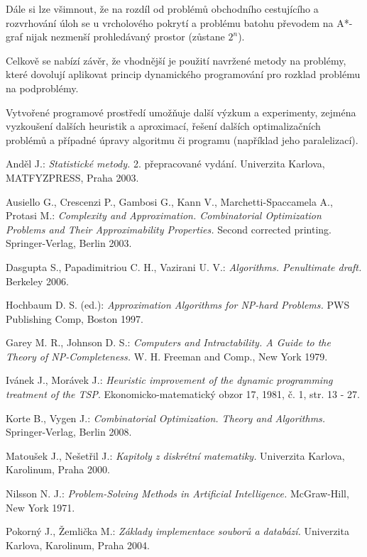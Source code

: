 \documentclass[12pt,notitlepage,fleqn]{report} %
\theoremstyle{definition}
\begin{document}
Dále si lze všimnout, že na rozdíl od problémů obchodního cestujícího a rozvrhování úloh se u vrcholového pokrytí a problému batohu převodem na A*-graf nijak nezmenší prohledávaný prostor (zůstane $2^n$).

Celkově se nabízí závěr, že vhodnější je použití navržené metody na problémy, které dovolují aplikovat princip dynamického programování pro rozklad problému na podproblémy.

Vytvořené programové prostředí umožňuje další výzkum a experimenty, zejména vyzkoušení dalších heuristik a aproximací, řešení dalších optimalizačních problémů a případné úpravy algoritmu či programu (například jeho paralelizací).

\begin{thebibliography}{99}
  Anděl J.: \emph{Statistické metody.} 2. přepracované vydání. Univerzita Karlova, MATFYZPRESS, Praha 2003.
 
  Ausiello G., Crescenzi P., Gambosi G., Kann V., Marchetti-Spaccamela A., Protasi M.: \emph{Complexity and Approximation. Combinatorial Optimization Problems and Their Approximability Properties.} Second corrected printing. Springer-Verlag, Berlin 2003. 

  Dasgupta S., Papadimitriou C. H., Vazirani U. V.: \emph{Algorithms. Penultimate draft.} Berkeley 2006. 
 
  Hochbaum D. S. (ed.): \emph{Approximation Algorithms for NP-hard Problems.} PWS Publishing Comp, Boston 1997.
  
  Garey M. R., Johnson D. S.: \emph{Computers and Intractability. A Guide to the Theory of NP-Completeness.} W. H. Freeman and Comp., New York 1979.
 
  Ivánek J., Morávek J.: \emph{Heuristic improvement of the dynamic programming treatment of the TSP}. Ekonomicko-matematický obzor 17, 1981, č. 1, str. 13 - 27. 
 
  Korte B., Vygen J.: \emph{Combinatorial Optimization. Theory and Algorithms.} Springer-Verlag, Berlin 2008.
 
  Matoušek J., Nešetřil J.: \emph{Kapitoly z diskrétní matematiky.} Univerzita Karlova, Karolinum, Praha 2000.

  Nilsson N. J.: \emph{Problem-Solving Methods in Artificial Intelligence.} McGraw-Hill, New York 1971.

   Pokorný J., Žemlička M.: \emph{Základy implementace souborů a databází.} Univerzita Karlova, Karolinum, Praha 2004.
 

\end{thebibliography}
\end{document}
